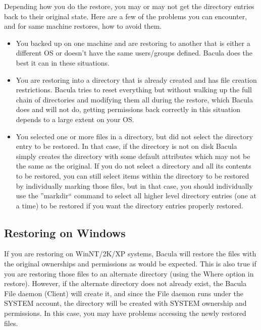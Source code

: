 Depending how you do the restore, you may or may not get the directory entries
back to their original state. Here are a few of the problems you can
encounter, and for same machine restores, how to avoid them. 

\begin{itemize}
\item You backed up on one machine and are restoring to another that is 
   either a different OS or doesn't have the same users/groups defined.  Bacula
   does the best it can in these situations.  
\item You are restoring into a directory that is already created and has  file
   creation restrictions. Bacula tries to reset everything  but without walking
   up the full chain of directories and modifying  them all during the restore,
which Bacula does and will not do,  getting permissions back correctly in this
situation depends to a  large extent on your OS.  
\item You selected one or more files in a directory, but did not select  the
   directory entry to be restored. In that case, if the directory  is not on disk
   Bacula simply creates the directory with some default  attributes which may
not be the same as the original.  If you do not select a directory and all its
contents to be restored,  you can still select items within the directory to
be restored by  individually marking those files, but in that case, you should
individually use the ''markdir`` command to select all higher level 
directory entries (one at a time) to be restored if you want the  directory
entries properly restored. 
\end{itemize}

\label{Windows}

\subsection*{Restoring on Windows}

If you are restoring on WinNT/2K/XP systems, Bacula will restore the files
with the original ownerships and permissions as would be expected. This is
also true if you are restoring those files to an alternate directory (using
the Where option in restore). However, if the alternate directory does not
already exist, the Bacula File daemon (Client) will create it, and since the
File daemon runs under the SYSTEM account, the directory will be created with
SYSTEM ownership and permissions. In this case, you may have problems
accessing the newly restored files. 

